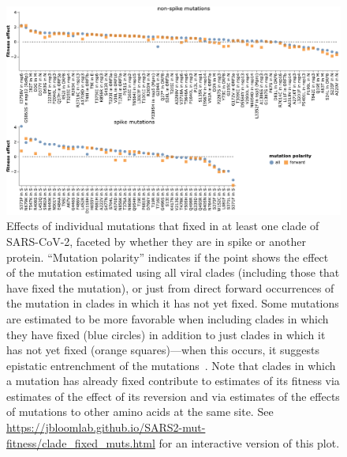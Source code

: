 \documentclass[9pt,twocolumn,twoside]{gsajnl_modified}
\begin{document}
\begin{figure}[b]
\includegraphics[width=\linewidth]{figs/fixed.pdf}
\caption{
Effects of individual mutations that fixed in at least one clade of SARS-CoV-2, faceted by whether they are in spike or another protein.
``Mutation polarity'' indicates if the point shows the effect of the mutation estimated using all viral clades (including those that have fixed the mutation), or just from direct forward occurrences of the mutation in clades in which it has not yet fixed.
Some mutations are estimated to be more favorable when including clades in which they have fixed (blue circles) in addition to just clades in which it has not yet fixed (orange squares)---when this occurs, it suggests epistatic entrenchment of the mutations~\citep{shah2015contingency, starr2018pervasive}.
Note that clades in which a mutation has already fixed contribute to estimates of its fitness via estimates of the effect of its reversion and via estimates of the effects of mutations to other amino acids at the same site.
See \url{https://jbloomlab.github.io/SARS2-mut-fitness/clade_fixed_muts.html} for an interactive version of this plot.
\label{fig:fixed}
}
\end{figure}
\end{document}
